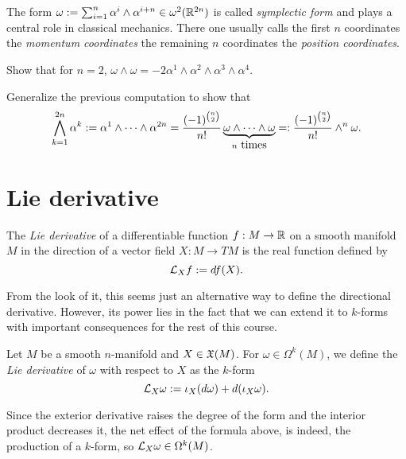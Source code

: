 \begin{exercise}\label{exe:symplectic}
The form $\omega := \sum_{i=1}^n \alpha^i\wedge \alpha^{i+n}\in\omega^2(\mathbb{R}^{2n})$ is called \emph{symplectic form} and plays a central role in classical mechanics. There one usually calls the first $n$ coordinates the \emph{momentum coordinates} the remaining $n$ coordinates the \emph{position coordinates}.

Show that for $n=2$, $\omega \wedge \omega = -2 \alpha^1\wedge\alpha^2\wedge\alpha^3\wedge\alpha^4$.

Generalize the previous computation to show that
\begin{equation}
  \bigwedge_{k=1}^{2n} \alpha^k := \alpha^1\wedge\cdots\wedge\alpha^{2n} = \frac{(-1)^{\binom{n}{2}}}{n!} \LaTeXunderbrace{\omega\wedge\cdots\wedge\omega}_{n\mbox{ times}} =: \frac{(-1)^{\binom{n}{2}}}{n!} \wedge^{n} \omega.
\end{equation}
\end{exercise}

\section{Lie derivative}

\begin{definition}
The \emph{Lie derivative} of a differentiable function $f:M\to\mathbb{R}$ on a smooth manifold $M$ in the direction of a vector field $X:M\to TM$ is the real function defined by
\begin{equation}
  \mathcal{L}_X f := df(X).
\end{equation}
\end{definition}

From the look of it, this seems just an alternative way to define the directional derivative.
However, its power lies in the fact that we can extend it to $k$-forms with important consequences for the rest of this course.

\begin{definition}
  Let $M$ be a smooth $n$-manifold and $X\in\mathfrak{X}(M)$.
  For $\omega\in\Omega^k(M)$, we define the \emph{Lie derivative} of $\omega$ with respect to $X$ as the $k$-form
  \begin{equation}\label{eq:cartanmagicf}
    \mathcal{L}_X\omega := \iota_X (d\omega) + d(\iota_X\omega).
  \end{equation}
\end{definition}

Since the exterior derivative raises the degree of the form and the interior product decreases it, the net effect of the formula above, is indeed, the production of a $k$-form, so $\mathcal{L}_X\omega \in \Omega^k(M)$.


